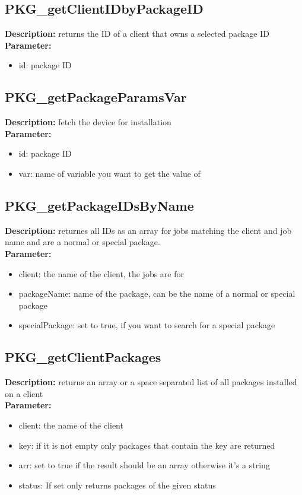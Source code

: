 \subsection{PKG\_getClientIDbyPackageID}
\textbf{Description:} returns the ID of a client that owns a selected package ID\\
\textbf{Parameter:}
\begin{itemize}
\item id: package ID
\end{itemize}

\subsection{PKG\_getPackageParamsVar}
\textbf{Description:} fetch the device for installation\\
\textbf{Parameter:}
\begin{itemize}
\item id: package ID
\item var: name of variable you want to get the value of
\end{itemize}

\subsection{PKG\_getPackageIDsByName}
\textbf{Description:} returnes all IDs as an array for jobs matching the client and job name and are a normal or special package.\\
\textbf{Parameter:}
\begin{itemize}
\item client: the name of the client, the jobs are for
\item packageName: name of the package, can be the name of a normal or special package
\item specialPackage: set to true, if you want to search for a special package
\end{itemize}

\subsection{PKG\_getClientPackages}
\textbf{Description:} returns an array or a space separated list of all packages installed on a client\\
\textbf{Parameter:}
\begin{itemize}
\item client: the name of the client
\item key: if it is not empty only packages that contain the key are returned
\item arr: set to true if the result should be an array otherwise it's a string
\item status: If set only returns packages of the given status
\end{itemize}

